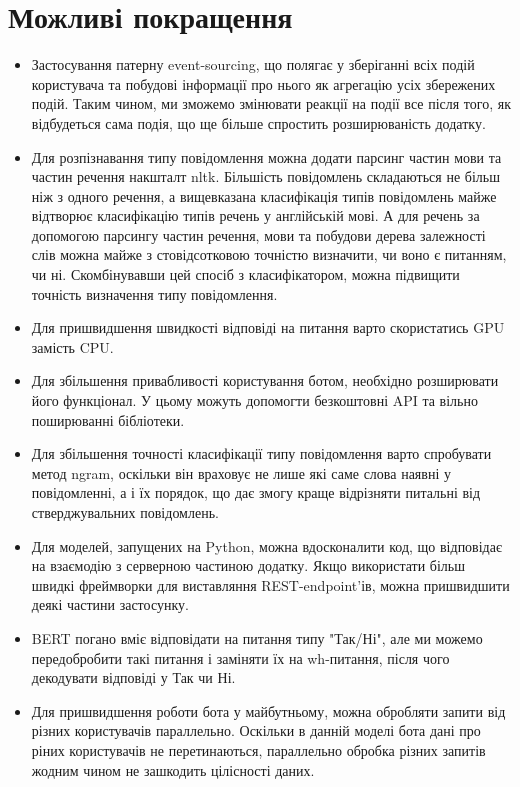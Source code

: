 \section*{Можливі покращення} 
\begin{itemize}
\item Застосування патерну event-sourcing, що полягає у зберіганні всіх подій користувача та побудові інформації про нього як агрегацію усіх збережених подій. Таким чином, ми зможемо змінювати реакції на події все після того, як відбудеться сама подія, що ще більше спростить розширюваність додатку.
\item Для розпізнавання типу повідомлення можна додати парсинг частин мови та частин речення накшталт nltk. Більшість повідомлень складаються не більш ніж з одного речення, а вищевказана класифікація типів повідомлень майже відтворює класифікацію типів речень у англійській мові. А для речень за допомогою парсингу частин речення, мови та побудови дерева залежності слів можна майже з стовідсотковою точністю визначити, чи воно є питанням, чи ні. Скомбінувавши цей спосіб з класифікатором, можна підвищити точність визначення типу повідомлення. 
\item Для пришвидшення швидкості відповіді на питання варто скористатись GPU замість CPU.
\item Для збільшення привабливості користування ботом, необхідно розширювати його функціонал. У цьому можуть допомогти безкоштовні API та вільно поширюванні бібліотеки. 
\item Для збільшення точності класифікації типу повідомлення варто спробувати метод ngram, оскільки він враховує не лише які саме слова наявні у повідомленні, а і їх порядок, що дає змогу краще відрізняти питальні від стверджувальних повідомлень.
\item Для моделей, запущених на Python, можна вдосконалити код, що відповідає на взаємодію з серверною частиною додатку. Якщо використати більш швидкі фреймворки для виставляння REST-endpoint'ів, можна пришвидшити деякі частини застосунку.
\item BERT погано вміє відповідати на питання типу "Так/Ні", але ми можемо передобробити такі питання і заміняти їх на wh-питання, після чого декодувати відповіді у Так чи Ні.
\item Для пришвидшення роботи бота у майбутньому, можна обробляти запити від різних користувачів параллельно. Оскільки в данній моделі бота дані про ріних користувачів не перетинаються, параллельно обробка різних запитів жодним чином не зашкодить цілісності даних.

\end{itemize}
